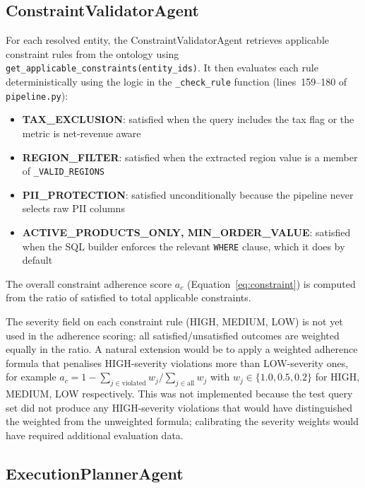 \documentclass[12pt,a4paper]{report}
\begin{document}
\subsection{ConstraintValidatorAgent}
\label{subsec:constraint-validator}

For each resolved entity, the ConstraintValidatorAgent retrieves applicable constraint rules from the ontology using \texttt{get\_applicable\_constraints(entity\_ids)}. It then evaluates each rule deterministically using the logic in the \texttt{\_check\_rule} function (lines~159--180 of \texttt{pipeline.py}):

\begin{itemize}[leftmargin=2em]
  \item \textbf{TAX\_EXCLUSION}: satisfied when the query includes the tax flag or the metric is net-revenue aware
  \item \textbf{REGION\_FILTER}: satisfied when the extracted region value is a member of \texttt{\_VALID\_REGIONS}
  \item \textbf{PII\_PROTECTION}: satisfied unconditionally because the pipeline never selects raw \ac{PII} columns
  \item \textbf{ACTIVE\_PRODUCTS\_ONLY, MIN\_ORDER\_VALUE}: satisfied when the \ac{SQL} builder enforces the relevant \texttt{WHERE} clause, which it does by default
\end{itemize}

The overall constraint adherence score $a_c$ (Equation~\ref{eq:constraint}) is computed from the ratio of satisfied to total applicable constraints.

The severity field on each constraint rule (HIGH, MEDIUM, LOW) is not yet used in the adherence scoring: all satisfied/unsatisfied outcomes are weighted equally in the ratio. A natural extension would be to apply a weighted adherence formula that penalises HIGH-severity violations more than LOW-severity ones, for example $a_c = 1 - \sum_{j \in \text{violated}} w_j / \sum_{j \in \text{all}} w_j$ with $w_j \in \{1.0, 0.5, 0.2\}$ for HIGH, MEDIUM, LOW respectively. This was not implemented because the test query set did not produce any HIGH-severity violations that would have distinguished the weighted from the unweighted formula; calibrating the severity weights would have required additional evaluation data.

\subsection{ExecutionPlannerAgent}
\label{subsec:execution-planner}
\end{document}
